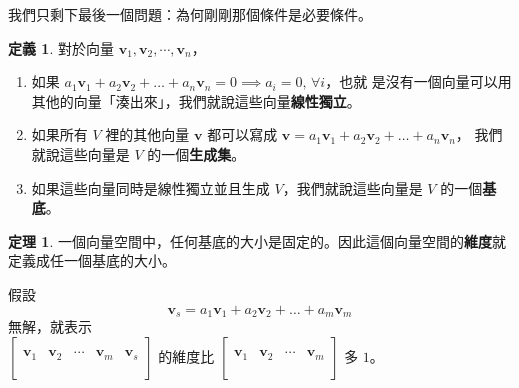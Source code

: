 \documentclass[notheorems,xcolor=dvipsnames]{beamer}
\theoremstyle{definition}
\newtheorem{theorem}{定理}
\newtheorem{definition}{定義}
\renewcommand*{\emph}[1]{{\bf #1}}
\begin{document}
\begin{frame}{{\secname}}
  我們只剩下最後一個問題：為何剛剛那個條件是必要條件。\pause

  \medskip
\begin{definition}
  對於向量 $\bm{v}_1, \bm{v}_2, \cdots, \bm{v}_n$，
  \begin{enumerate}
    \item 如果 $a_1 \bm{v}_1 + a_2 \bm{v}_2 + \ldots + a_n \bm{v}_n = 0 \implies a_i = 0,\, \forall i$，也就
      是沒有一個向量可以用其他的向量「湊出來」，我們就說這些向量\emph{線性獨立}。
    \item 如果所有 $V$ 裡的其他向量 $\bm{v}$ 都可以寫成 $\bm{v} = a_1 \bm{v}_1 + a_2 \bm{v}_2 + \ldots + a_n \bm{v}_n$，
      我們就說這些向量是 $V$ 的一個\emph{生成集}。
    \item 如果這些向量同時是線性獨立並且生成 $V$，我們就說這些向量是 $V$ 的一個\emph{基底}。
  \end{enumerate}
\end{definition}
\end{frame}

\begin{frame}[t]{{\secname}}
\begin{theorem}
一個向量空間中，任何基底的大小是固定的。因此這個向量空間的\emph{維度}就定義成任一個基底的大小。
\end{theorem}\pause

\bigskip
假設\vspace{-.5em}
\[ \bm{v}_s = a_1 \bm{v}_1 + a_2 \bm{v}_2 + \ldots + a_m \bm{v}_m \]
無解，就表示\\
$\begin{bmatrix}
  & & & & \\
  \bm{v}_1 & \bm{v}_2 & \cdots & \bm{v}_m & \bm{v}_s \\
  & & & & \\
\end{bmatrix}$ 的維度比
$\begin{bmatrix}
  & & & \\
  \bm{v}_1 & \bm{v}_2 & \cdots & \bm{v}_m \\
  & & & \\
\end{bmatrix}$ 多 $1$。

\end{frame}
\end{document}
